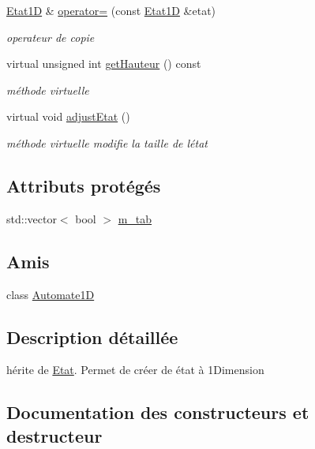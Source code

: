 \begin{DoxyCompactItemize}
\hyperlink{class_etat1_d}{Etat1D} \& \hyperlink{class_etat1_d_a4ce3b4931c766b2a6cdf6e3ac7590c5a}{operator=} (const \hyperlink{class_etat1_d}{Etat1D} \&etat)
\begin{DoxyCompactList}\small\item\em operateur de copie \end{DoxyCompactList}\item 
virtual unsigned int \hyperlink{class_etat1_d_aed8c9082f8caefeef7687ba1f4590f40}{get\+Hauteur} () const 
\begin{DoxyCompactList}\small\item\em méthode virtuelle \end{DoxyCompactList}\item 
virtual void \hyperlink{class_etat1_d_a95f0f0455d3dfda771330648ec5395fb}{adjust\+Etat} ()
\begin{DoxyCompactList}\small\item\em méthode virtuelle modifie la taille de l\textquotesingle{}état \end{DoxyCompactList}\end{DoxyCompactItemize}
\subsection*{Attributs protégés}
\begin{DoxyCompactItemize}
\item 
std\+::vector$<$ bool $>$ \hyperlink{class_etat1_d_a07068969d6d83e95a8d04363914adf33}{m\+\_\+tab}
\end{DoxyCompactItemize}
\subsection*{Amis}
\begin{DoxyCompactItemize}
\item 
class \hyperlink{class_etat1_d_a7b442c5e6a2ad84fcc725706d1f77dfe}{Automate1D}
\end{DoxyCompactItemize}


\subsection{Description détaillée}
hérite de \hyperlink{class_etat}{Etat}. Permet de créer de état à 1\+Dimension 

\subsection{Documentation des constructeurs et destructeur}
